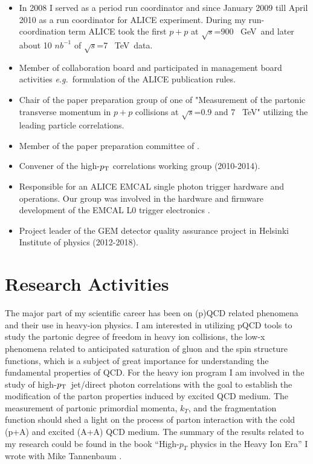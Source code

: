 \documentclass[12pt]{article}
\newcommand{\s} {\ensuremath{\sqrt{s}}}
\def\tev{\mbox{~TeV}}
\def\gev{\mbox{~GeV}}
\def\eg{{\it e.g.}}
\def\pt#1{\ensuremath{p_{\rm T#1}}}
\begin{document}
\begin{itemize}
\item In 2008 I served as a period run coordinator and since January 2009 till April 2010  as a run coordinator for ALICE experiment. During my run-coordination term ALICE took the first $p+p$ at \s=900 \gev\ and later about 10 $nb^{-1}$ of \s=7 \tev\ data.
\item Member of collaboration board and participated in management board activities \eg\ formulation of the ALICE publication rules.
\item Chair of the paper preparation group of one of  "Measurement of the partonic transverse momentum in $p+p$ collisions at \s=0.9 and 7 \tev" utilizing the leading particle correlations. 
\item Member of the paper preparation committee of \cite{Aamodt2012}.
\item Convener of the high-\pt{} correlations working group (2010-2014).
\item Responsible for an ALICE EMCAL single photon trigger hardware and operations. Our group was involved in the hardware and firmware development of the EMCAL L0 trigger electronics \cite{JiriKral2012}.
\item Project leader of the GEM detector quality assurance project in Helsinki Institute of physics (2012-2018).
\end{itemize}



\section{Research Activities}
The major part of my scientific career has been on (p)QCD related phenomena and their use in heavy-ion physics.  I am interested in utilizing pQCD tools to study the partonic degree of freedom in heavy ion collisions, the low-x phenomena related to anticipated saturation of gluon and the spin structure functions, which is a subject of great importance for understanding the fundamental properties of QCD.  For the heavy ion program I am involved in the study of high-\pt{}\ jet/direct photon correlations with the goal to establish the modification of the parton properties induced by excited QCD medium.  The measurement of partonic primordial momenta, $k_T$, and the fragmentation function should shed a light on the process of parton interaction with the cold (p+A) and excited (A+A) QCD medium. 
The summary of the results related to my research could be found in the book ``High-$p_{T}$ physics in the Heavy Ion Era'' I wrote with Mike Tannenbaum  \cite{JanRak2013}.



%

\end{document}
